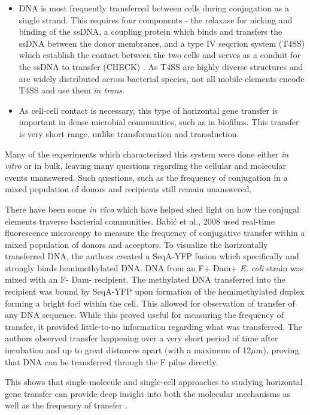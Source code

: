 \begin{itemize}
	\item  DNA is most frequently transferred between cells during
		conjugation as a single strand. This requires four components -
		the relaxase for nicking and binding of the ssDNA, a coupling
		protein which binds and transfers the ssDNA between the donor
		membranes, and a type IV seqcrion system (T4SS) which establish
		the contact between the two cells and serves as a conduit for
		the ssDNA to transfer (CHECK) \cite{Guglielmini:2014bc}. As T4SS
		are highly diverse structures and are widely distributed across
		bacterial species, not all mobile elements encode T4SS and use
		them \textit{in trans}.
	\item As cell-cell contact is necessary, this type of horizontal gene
		transfer is important in dense microbial communities, such as in
		biofilms. This transfer is very short range, unlike
		transformation and transduction.
\end{itemize}

Many of the experiments which characterized this system were done either \textit{in
vitro} or in bulk, leaving many questions regarding the cellular and molecular
events unanswered. Such questions, such as the frequency of conjugation in a
mixed population of donors and recipients still remain unanswered.  

There have been some \textit{in vivo} which have helped shed light on how the
conjugal elements traverse bacterial communities. Babi\'{c} et al., 2008 used
real-time fluorescence microscopy to measure the frequency of conjugative
transfer within a mixed population of donors and acceptors. To visualize the
horizontally transferred DNA, the authors created a SeqA-YFP fusion which
specifically and strongly binds hemimethylated DNA. DNA from an F+ Dam+
\textit{E. coli} strain was mixed with an F- Dam- recipient. The
methylated DNA transferred into the recipient was bound by SeqA-YFP upon
formation of the hemimethylated duplex forming a bright foci within the cell.
This allowed for observation of transfer of any DNA sequence. While this proved
useful for measuring the frequency of transfer, it provided little-to-no
information regarding what was transferred. The authors observed transfer
happening over a very short period of time after incubation and up to great
distances apart (with a maximum of 12$\mu$m), proving that DNA can be
transferred through the F pilus directly.

This shows that single-molecule and single-cell approaches to studying
horizontal gene transfer can provide deep insight into both the molecular
mechanisms as well as the frequency of transfer \cite{Babic:2008bl}.


